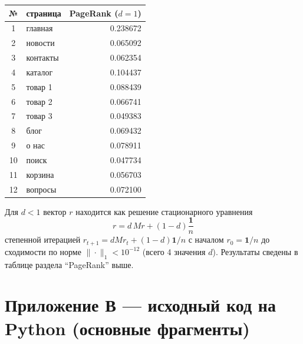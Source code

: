 \documentclass[12pt,a4paper]{article}
\begin{document}
\begin{center}
\footnotesize
\begin{tabular}{|c|l|r|}
\hline
№ & страница & PageRank ($d=1$) \\ \hline
1 & главная & 0.238672 \\
2 & новости & 0.065092 \\
3 & контакты & 0.062354 \\
4 & каталог & 0.104437 \\
5 & товар 1 & 0.088439 \\
6 & товар 2 & 0.066741 \\
7 & товар 3 & 0.049383 \\
8 & блог & 0.069432 \\
9 & о нас & 0.078911 \\
10 & поиск & 0.047734 \\
11 & корзина & 0.056703 \\
12 & вопросы & 0.072100 \\ \hline
\end{tabular}
\end{center}

Для $d<1$ вектор $r$ находится как решение стационарного уравнения
\[
r=d\,M r+(1-d)\frac{\mathbf{1}}{n}
\]
степенной итерацией $r_{t+1}=dMr_t+(1-d)\mathbf{1}/n$ с началом $r_0=\mathbf{1}/n$ до сходимости по норме $\|\cdot\|_1<10^{-12}$ (всего 4 значения $d$). Результаты сведены в таблице раздела ``PageRank'' выше.

\section{Приложение В --- исходный код на Python (основные фрагменты)}
\end{document}
